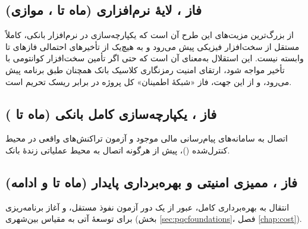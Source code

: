 \subsection*{فاز \texorpdfstring{}{۶}، لایهٔ نرم‌افزاری \texorpdfstring{}{PQC} (ماه \texorpdfstring{}{۲} تا \texorpdfstring{}{۹}، موازی)}
از بزرگ‌ترین مزیت‌های این طرح آن است که یکپارچه‌سازی  در نرم‌افزار بانکی، کاملاً مستقل از سخت‌افزار فیزیکی  پیش می‌رود و به هیچ‌یک از تأخیرهای احتمالی فازهای  تا  وابسته نیست. این استقلال به‌معنای آن است که حتی اگر تأمین سخت‌افزار کوانتومی با تأخیر مواجه شود، ارتقای امنیت رمزنگاری کلاسیک بانک همچنان طبق برنامه پیش می‌رود، و از این جهت، فاز  «شبکهٔ اطمینان» کل پروژه در برابر ریسک تحریم است.

\subsection*{فاز \texorpdfstring{}{۷}، یکپارچه‌سازی کامل بانکی (ماه \texorpdfstring{}{۱۰} تا \texorpdfstring{}{۱۴})}
اتصال  به سامانه‌های پیام‌رسانی مالی موجود و آزمون تراکنش‌های واقعی در محیط کنترل‌شده ()، پیش از هرگونه اتصال به محیط عملیاتی زندهٔ بانک.

\subsection*{فاز \texorpdfstring{}{۸}، ممیزی امنیتی و بهره‌برداری پایدار (ماه \texorpdfstring{}{۱۳} تا \texorpdfstring{}{۱۶} و ادامه)}
انتقال به بهره‌برداری کامل، عبور از یک دور آزمون نفوذ مستقل، و آغاز برنامه‌ریزی برای توسعهٔ آتی به مقیاس بین‌شهری (بخش \ref{sec:pqcfoundations}، فصل \ref{chap:cost}).


